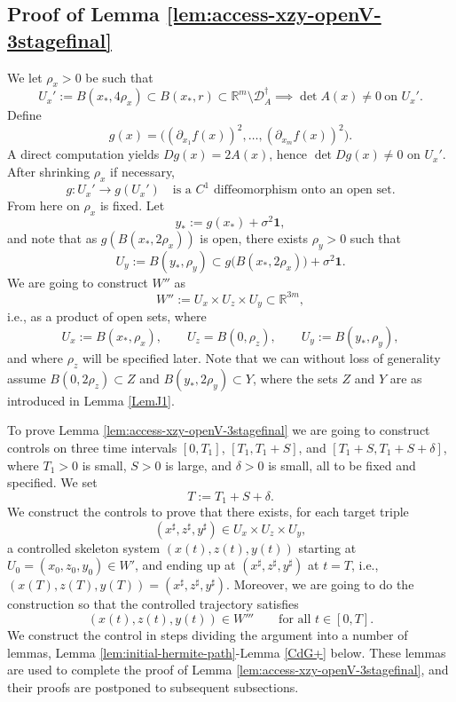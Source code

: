 \documentclass[11pt, a4paper,leqno]{amsart}
\theoremstyle{definition}
\numberwithin{equation}{section}
\newcommand{\R}{\mathbb R}
\begin{document}
\subsection{Proof of  Lemma \ref{lem:access-xzy-openV-3stagefinal}} We let $\rho_x>0$ be such that
\begin{equation}\label{eq:Ux-final}
U_x':=B(x_\ast,4\rho_x)
\subset B(x_\ast,r)\subset\mathbb R^m\setminus \mathcal D_A^\dagger\implies
 \det A(x)\neq0 \ \text{on } U_x'.
\end{equation}
Define
\[
g(x)=\big((\partial_{x_1}f(x))^2,\dots,(\partial_{x_m}f(x))^2\big).
\]
A direct computation yields $Dg(x)=2A(x)$, hence
$\det Dg(x)\neq0$ on $U_x'$. After shrinking $\rho_x$ if necessary,
\begin{equation}\label{eq:g-diffeo-final}
g:U_x'\to g(U_x')
\quad\text{is a $C^1$ diffeomorphism onto an open set.}
\end{equation}
From here on $\rho_x$ is fixed. Let
\[
y_\ast := g(x_\ast)+\sigma^2\mathbf 1,
\]
and note that as $g(B(x_\ast,2\rho_x))$ is open,
there exists $\rho_y>0$ such that
\[
U_y
:=
B(y_\ast,\rho_y)
\subset
g\big(B(x_\ast,2\rho_x)\big)
+
\sigma^2\mathbf 1.
\]
We are going to construct $W''$ as
\[
W'' := U_x \times U_z \times U_y \subset \R^{3m},
\]
i.e., as a product of open sets, where
\[
U_x:=B(x_\ast,\rho_x),\qquad
U_z=B(0,\rho_z),
\qquad
U_y:=B(y_\ast,\rho_y),
\]
and where  $\rho_z$ will be specified later. Note that we can without loss of generality assume $B(0,2\rho_z)\subset Z$ and $B(y_\ast,2\rho_y)\subset Y$, where the sets $Z$ and $Y$ are as introduced in Lemma \ref{LemJ1}.




To prove Lemma \ref{lem:access-xzy-openV-3stagefinal} we are going to construct controls on three time intervals $[0,T_1]$, $[T_1,T_1+S]$, and $[T_1+S,T_1+S+\delta]$, where  $T_1>0$ is small, $S>0$ is large, and $\delta>0$ is small, all to be fixed and specified. We set
\begin{equation}\label{frame1}
T:=T_1+S+\delta.
\end{equation}
We construct the controls to prove that there exists, for each target triple
\begin{equation}\label{frame2}
(x^\sharp,z^\sharp,y^\sharp)\in
U_x\times U_z\times U_y,
\end{equation}
 a controlled skeleton system $(x(t),z(t),y(t))$ starting at  $U_0=(x_0,z_0,y_0)\in W'$,  and
ending up at $(x^\sharp,z^\sharp,y^\sharp)$ at $t=T$, i.e., $(x(T),z(T),y(T))=(x^\sharp,z^\sharp,y^\sharp)$. Moreover, we are going to do the construction so that the controlled trajectory satisfies
\[
(x(t),z(t),y(t))\in W'''
\qquad \text{for all } t\in[0,T].
\]
We construct the control in steps dividing the argument into a number of lemmas, Lemma \ref{lem:initial-hermite-path}-Lemma \ref{CdG+} below. These lemmas are used to complete the proof of Lemma \ref{lem:access-xzy-openV-3stagefinal}, and their proofs are postponed to subsequent subsections.
\end{document}
